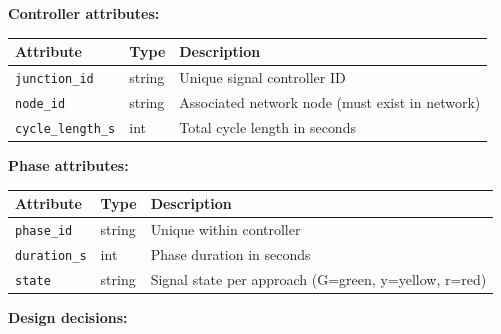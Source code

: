 \textbf{Controller attributes:}

\begin{longtable}[]{@{}lll@{}}
\toprule\noalign{}
Attribute & Type & Description \\
\midrule\noalign{}
\endhead
\bottomrule\noalign{}
\endlastfoot
\texttt{junction\_id} & string & Unique signal controller ID \\
\texttt{node\_id} & string & Associated network node (must exist in
network) \\
\texttt{cycle\_length\_s} & int & Total cycle length in seconds \\
\end{longtable}

\textbf{Phase attributes:}

\begin{longtable}[]{@{}lll@{}}
\toprule\noalign{}
Attribute & Type & Description \\
\midrule\noalign{}
\endhead
\bottomrule\noalign{}
\endlastfoot
\texttt{phase\_id} & string & Unique within controller \\
\texttt{duration\_s} & int & Phase duration in seconds \\
\texttt{state} & string & Signal state per approach (G=green, y=yellow,
r=red) \\
\end{longtable}

\textbf{Design decisions:}

